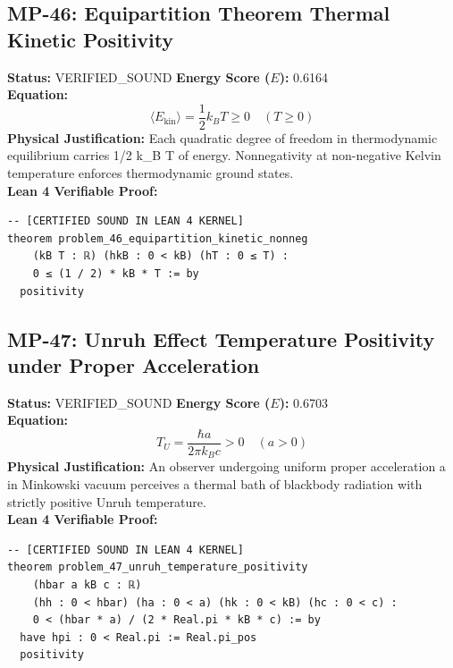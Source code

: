 \documentclass[11pt, a4paper]{article}
\begin{document}
\subsection{MP-46: Equipartition Theorem Thermal Kinetic Positivity}
\textbf{Status:} VERIFIED\_SOUND \hfill \textbf{Energy Score ($E$):} 0.6164\\
\textbf{Equation:}
\begin{equation*}
\langle E_{\text{kin}} \rangle = \frac{1}{2} k_B T \ge 0 \quad (T \ge 0)
\end{equation*}
\textbf{Physical Justification:} Each quadratic degree of freedom in thermodynamic equilibrium carries 1/2 k\_B T of energy. Nonnegativity at non-negative Kelvin temperature enforces thermodynamic ground states.\\
\textbf{Lean 4 Verifiable Proof:}
\begin{verbatim}
-- [CERTIFIED SOUND IN LEAN 4 KERNEL]
theorem problem_46_equipartition_kinetic_nonneg
    (kB T : ℝ) (hkB : 0 < kB) (hT : 0 ≤ T) :
    0 ≤ (1 / 2) * kB * T := by
  positivity

\end{verbatim}

\subsection{MP-47: Unruh Effect Temperature Positivity under Proper Acceleration}
\textbf{Status:} VERIFIED\_SOUND \hfill \textbf{Energy Score ($E$):} 0.6703\\
\textbf{Equation:}
\begin{equation*}
T_U = \frac{\hbar a}{2\pi k_B c} > 0 \quad (a > 0)
\end{equation*}
\textbf{Physical Justification:} An observer undergoing uniform proper acceleration a in Minkowski vacuum perceives a thermal bath of blackbody radiation with strictly positive Unruh temperature.\\
\textbf{Lean 4 Verifiable Proof:}
\begin{verbatim}
-- [CERTIFIED SOUND IN LEAN 4 KERNEL]
theorem problem_47_unruh_temperature_positivity
    (hbar a kB c : ℝ)
    (hh : 0 < hbar) (ha : 0 < a) (hk : 0 < kB) (hc : 0 < c) :
    0 < (hbar * a) / (2 * Real.pi * kB * c) := by
  have hpi : 0 < Real.pi := Real.pi_pos
  positivity

\end{verbatim}
\end{document}
